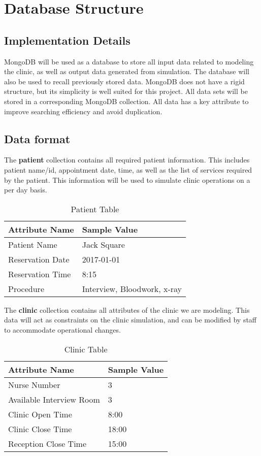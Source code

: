 \documentclass[12pt]{article}
\begin{document}
\section{Database Structure}

\subsection{Implementation Details}
MongoDB will be used as a database to store all input data related to modeling the clinic, as well as output data generated from simulation. The database will also be used to recall previously stored data. MongoDB does not have a rigid structure, but its simplicity is well suited for this project. All data sets will be stored in a corresponding MongoDB collection. All data has a key attribute to improve searching efficiency and avoid duplication.

\subsection{Data format}
The \textbf{patient} collection contains all required patient information. This includes patient name/id, appointment date, time, as well as the list of services required by the patient. This information will be used to simulate clinic operations on a per day basis.
\begin{table}[H]
\centering
\caption{Patient Table}
\label{patient-table}
\begin{tabular}{|l|l|}
\hline
Attribute Name   & Sample Value                \\ \hline
Patient Name     & Jack Square                 \\ \hline
Reservation Date & 2017-01-01                  \\ \hline
Reservation Time & 8:15                        \\ \hline
Procedure        & Interview, Bloodwork, x-ray \\ \hline
\end{tabular}
\end{table}
\hfill

The \textbf{clinic} collection contains all attributes of the clinic we are modeling. This data will act as constraints on the clinic simulation, and can be modified by staff to accommodate operational changes.
\begin{table}[H]
\centering
\caption{Clinic Table}
\label{clinic-table}
\begin{tabular}{|l|l|}
\hline
Attribute Name           & Sample Value \\ \hline
Nurse Number             & 3            \\ \hline
Available Interview Room & 3            \\ \hline
Clinic Open Time         & 8:00         \\ \hline
Clinic Close Time        & 18:00        \\ \hline
Reception Close Time     & 15:00        \\ \hline
\end{tabular}
\end{table}
\end{document}
